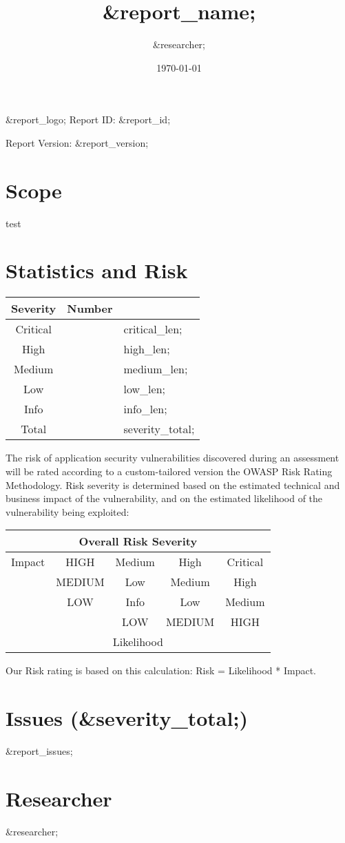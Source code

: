 \documentclass[12pt]{article}
\author{&researcher;}
\title{&report_name;}
\date{\today}
\begin{document}
\maketitle

&report_logo;
Report ID: &report_id;

Report Version: &report_version;
\newpage

\tableofcontents

\newpage

\section{Scope}

test

\section{Statistics and Risk}

\begin{center}
\begin{tabular}{||c c||}
 \hline
 Severity & Number \\ [0.5ex] 
 \hline\hline
 Critical & &critical_len; \\ 
 \hline
 High & &high_len; \\
 \hline
 Medium & &medium_len; \\
 \hline
 Low & &low_len; \\
 \hline
 Info & &info_len; \\
 \hline
 Total & &severity_total; \\ [1ex] 
 \hline
\end{tabular}
\end{center}

The risk of application security vulnerabilities discovered during an assessment will be rated according to a custom-tailored version the OWASP Risk Rating Methodology. Risk severity is determined based on the estimated technical and business impact of the vulnerability, and on the estimated likelihood of the vulnerability being exploited:\\
\begin{center}
\begin{tabular}{|c|c|c|c|c|}\hline\hline
   \multicolumn{5}{|c|}{Overall Risk Severity}\\\hline\hline
      Impact & HIGH & Medium & High & Critical \\\cline{1-5}
	       & MEDIUM & Low & Medium & High \\\cline{1-5}
	       & LOW & Info & Low & Medium \\\cline{1-5}
                &   & LOW & MEDIUM & HIGH \\\cline{1-5}
   \multicolumn{5}{|c|}{Likelihood}\\\hline\hline
\end{tabular}
\end{center}

Our Risk rating is based on this calculation: Risk = Likelihood * Impact.

\section{Issues (&severity_total;)}

&report_issues;

\section{Researcher}

&researcher;
\end{document}
